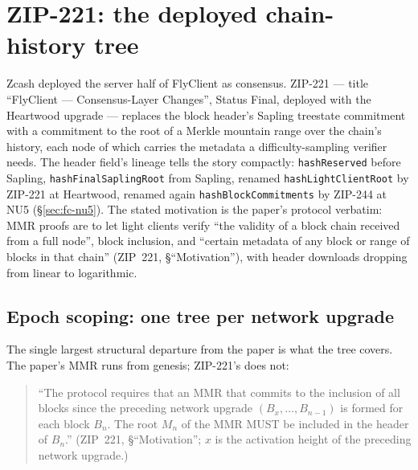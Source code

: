 \documentclass[11pt,a4paper]{article}
\theoremstyle{definition}
\begin{document}
\section{ZIP-221: the deployed chain-history tree}\label{sec:fc-zip221}

Zcash deployed the server half of FlyClient as consensus. ZIP-221 ---
title ``FlyClient --- Consensus-Layer Changes'', Status Final, deployed
with the Heartwood upgrade --- replaces the block header's Sapling
treestate commitment with a commitment to the root of a Merkle mountain
range over the chain's history, each node of which carries the metadata a
difficulty-sampling verifier needs. The header field's lineage tells the
story compactly: \texttt{hashReserved} before Sapling,
\texttt{hashFinalSaplingRoot} from Sapling, renamed
\texttt{hashLightClientRoot} by ZIP-221 at Heartwood, renamed again
\texttt{hashBlockCommitments} by ZIP-244 at NU5
(\S\ref{sec:fc-nu5}). The stated motivation is the paper's protocol
verbatim: MMR proofs are to let light clients verify ``the validity of a
block chain received from a full node'', block inclusion, and ``certain
metadata of any block or range of blocks in that chain'' (ZIP~221,
\S``Motivation''), with header downloads dropping from linear to
logarithmic.

\subsection{Epoch scoping: one tree per network upgrade}
\label{sec:fc-epoch}

The single largest structural departure from the paper is what the tree
covers. The paper's MMR runs from genesis; ZIP-221's does not:

\begin{quote}
``The protocol requires that an MMR that commits to the inclusion of all
blocks since the preceding network upgrade $(B_x, \ldots, B_{n-1})$ is
formed for each block $B_n$. The root $M_n$ of the MMR MUST be included
in the header of $B_n$.'' (ZIP~221, \S``Motivation''; $x$ is the
activation height of the preceding network upgrade.)
\end{quote}
\end{document}
